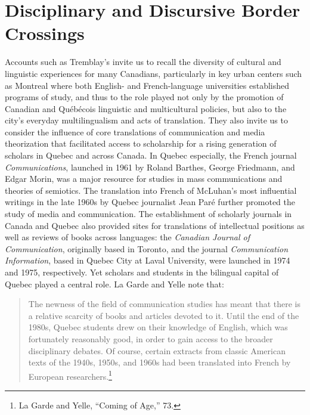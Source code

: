 \documentclass{tufte-handout}
\begin{document}
\hypertarget{disciplinary-and-discursive-border-crossings}{%
\section{Disciplinary and Discursive Border
Crossings}\label{disciplinary-and-discursive-border-crossings}}

Accounts such as Tremblay's invite us to recall the diversity of
cultural and linguistic experiences for many Canadians, particularly in
key urban centers such as Montreal where both English- and
French-language universities established programs of study, and thus to
the role played not only by the promotion of Canadian and Québécois
linguistic and multicultural policies, but also to the city's everyday
multilingualism and acts of translation. They also invite us to consider
the influence of core translations of communication and media
theorization that facilitated access to scholarship for a rising
generation of scholars in Quebec and across Canada. In Quebec
especially, the French journal \emph{Communications}, launched in 1961
by Roland Barthes, George Friedmann, and Edgar Morin, was a major
resource for studies in mass communications and theories of semiotics.
The translation into French of McLuhan's most influential writings in
the late 1960s by Quebec journalist Jean Paré further promoted the study
of media and communication. The establishment of scholarly journals in
Canada and Quebec also provided sites for translations of intellectual
positions as well as reviews of books across languages: the
\emph{Canadian Journal of Communication}, originally based in Toronto,
and the journal \emph{Communication Information}, based in Quebec City
at Laval University, were launched in 1974 and 1975, respectively. Yet
scholars and students in the bilingual capital of Quebec played a
central role. La Garde and Yelle note that:

\begin{quote}
The newness of the field of communication studies has meant that there
is a relative scarcity of books and articles devoted to it. Until the
end of the 1980s, Quebec students drew on their knowledge of English,
which was fortunately reasonably good, in order to gain access to the
broader disciplinary debates. Of course, certain extracts from classic
American texts of the 1940s, 1950s, and 1960s had been translated into
French by European researchers.\footnote{La Garde and Yelle, ``Coming of
  Age,'' 73.}
\end{quote}
\end{document}
